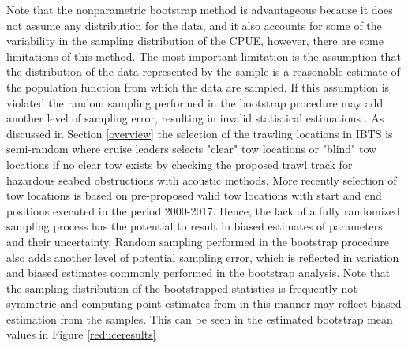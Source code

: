 \documentclass[a4paper 12pt]{article}
\numberwithin{equation}{section}
\begin{document}
\clearpage
Note that the nonparametric bootstrap method is advantageous  because it does not assume any distribution for the data, and it also accounts for some of the variability in the sampling distribution of the CPUE, however, there are some limitations of this method. The most important limitation is the assumption that the distribution of the data represented by the sample is a reasonable estimate of the population function from which the data are sampled. If this assumption is violated the random sampling  performed in the bootstrap procedure may add another level of sampling error, resulting in invalid statistical estimations \citep{haukoos2005advanced}. As discussed in Section \ref{overview} the selection of the trawling locations in IBTS is semi-random where cruise leaders selects "clear" tow locations or "blind" tow locations if no clear tow exists by checking the proposed trawl track for hazardous seabed obstructions with acoustic methods. More recently selection of tow locations is based on pre-proposed valid tow locations with start and end positions executed in the period 2000-2017. Hence, the lack of a fully randomized sampling process has the potential to result in biased estimates of parameters and their uncertainty. Random sampling performed in the bootstrap procedure also adds another level of potential sampling error, which is reflected in variation and biased estimates commonly performed in the bootstrap analysis. Note that the sampling distribution of the bootstrapped statistics is frequently not symmetric and computing point estimates from in this manner may reflect biased estimation from the samples. This can be seen in the estimated bootstrap mean values in Figure \ref{reduceresults}\\
\end{document}

